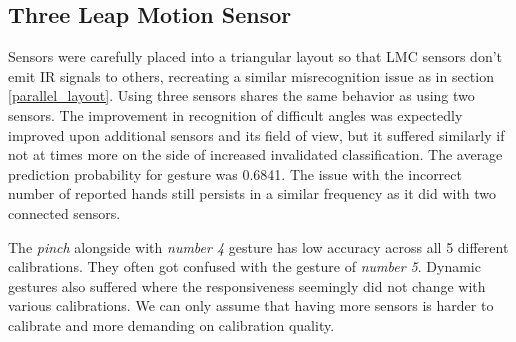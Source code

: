 \subsection{Three Leap Motion Sensor}

Sensors were carefully placed into a triangular layout so that LMC sensors don't emit IR signals to others, recreating a similar misrecognition issue as in section \ref{parallel_layout}. Using three sensors shares the same behavior as using two sensors. The improvement in recognition of difficult angles was expectedly improved upon additional sensors and its field of view, but it suffered similarly if not at times more on the side of increased invalidated classification. The average prediction probability for gesture was 0.6841. The issue with the incorrect number of reported hands still persists in a similar frequency as it did with two connected sensors. 

The \textit{pinch} alongside with \textit{number 4} gesture has low accuracy across all 5 different calibrations. They often got confused with the gesture of \textit{number 5}. Dynamic gestures also suffered where the responsiveness seemingly did not change with various calibrations. We can only assume that having more sensors is harder to calibrate and more demanding on calibration quality.



